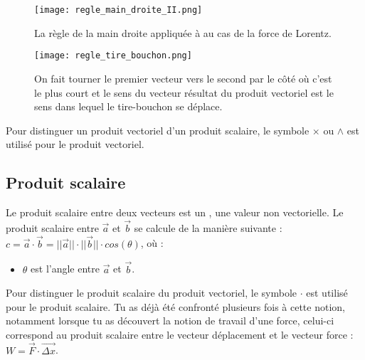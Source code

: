 \begin{figure}[!ht]
    \centering
    \begin{minipage}[b]{.47\linewidth}
        \centering
        \texttt{[image: regle\_main\_droite\_II.png]}
        \caption{La règle de la main droite appliquée à au cas de la force de Lorentz.}
        \label{regle_main_droite_II}
    \end{minipage}
    \begin{minipage}[b]{.47\linewidth}
        \centering
        \texttt{[image: regle\_tire\_bouchon.png]}
        \caption{On fait tourner le premier vecteur vers le second par le côté où c'est le plus court et le sens du vecteur résultat du produit vectoriel est le sens dans lequel le tire-bouchon se déplace.}
        \label{regle_tire_bouchon}
    \end{minipage}
\end{figure}

Pour distinguer un produit vectoriel d'un produit scalaire, le symbole \(\times\) ou \(\wedge\) est utilisé pour le produit vectoriel.

\newpage

\subsection{Produit scalaire}
Le produit scalaire entre deux vecteurs est un , une valeur non vectorielle.
Le produit scalaire entre \(\vec{a}\) et \(\vec{b}\) se calcule de la manière suivante :
\(c=\vec{a} \cdot \vec{b}= ||\vec{a}|| \cdot ||\vec{b}|| \cdot cos(\theta) \), où :
\begin{itemize}[label=\textbullet]
    \item \(\theta\) est l'angle entre \(\vec{a}\) et \(\vec{b}\).
\end{itemize}
Pour distinguer le produit scalaire du produit vectoriel, le symbole \(\cdot\) est utilisé pour le produit scalaire.
Tu as déjà été confronté plusieurs fois à cette notion, notamment lorsque tu as découvert la notion de travail d'une force, celui-ci correspond au produit scalaire entre le vecteur déplacement et le vecteur force :
\(W=\vec{F} \cdot \vec{\Delta x}\).

